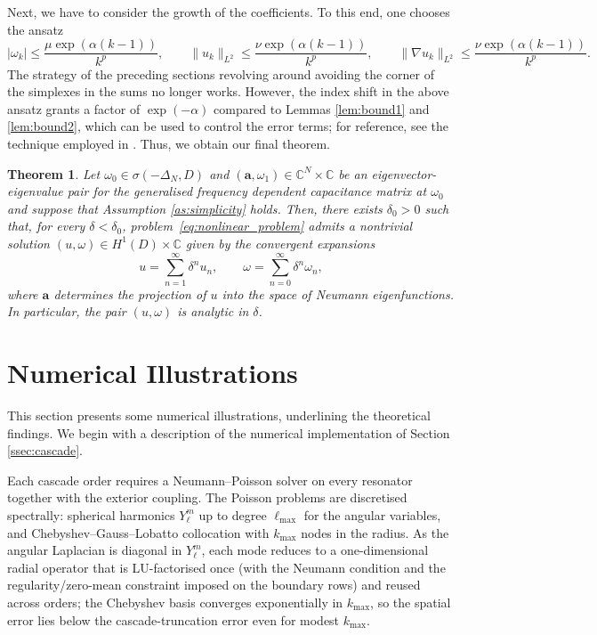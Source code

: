 \documentclass[a4paper,reqno,twoside]{amsart}
\numberwithin{equation}{section}
\newtheorem{theorem}{Theorem}[section]
\theoremstyle{definition}
\newcommand{\<}{\ensuremath \leq}
\renewcommand{\>}{\ensuremath \geq}
\begin{document}
Next, we have to consider the growth of the coefficients. To this end, one chooses the ansatz
\begin{equation}
    \lvert \omega_k \rvert \leq \frac{\mu \exp(\alpha(k-1))}{k^p},
        \qquad
        \lVert u_k \rVert_{L^2} \leq \frac{\nu \exp(\alpha (k-1))}{k^p},
        \qquad
        \lVert \nabla u_k \rVert_{L^2} \leq \frac{\nu \exp(\alpha (k-1))}{k^p}.
\end{equation}
The strategy of the preceding sections revolving around avoiding the corner of the simplexes in the sums no longer works. However, the index shift in the above ansatz grants a factor of $\exp(-\alpha)$ compared to Lemmas \ref{lem:bound1} and \ref{lem:bound2}, which can be used to control the error terms; for reference, see the technique employed in \cite{sacchetti2023perturbation}. Thus, we obtain our final theorem.
\begin{theorem}\label{thm:approximation_convergence_nonlinear}
    Let $\omega_0\in\sigma(-\Delta_N,D)$ and $(\mathbf{a}, \omega_1) \in \mathbb{C}^N \times \mathbb{C}$ be an eigenvector-eigenvalue pair for the generalised frequency dependent capacitance matrix at $\omega_0$ and suppose that Assumption \ref{as:simplicity} holds.
    Then, there exists $\delta_0 > 0$ such that, for every
    $\delta < \delta_0$, problem~\eqref{eq:nonlinear_problem} admits
    a nontrivial solution $(u, \omega) \in H^1(D) \times \mathbb{C}$
    given by the convergent expansions
    \begin{equation}
        u = \sum_{n=1}^{\infty} \delta^{n} u_n,
        \qquad
        \omega = \sum_{n=0}^{\infty} \delta^{n} \omega_n,
    \end{equation}
    where $\mathbf{a}$ determines the projection of $u$ into the space of Neumann eigenfunctions. In particular, the pair $(u,\omega)$ is analytic in $\delta$.
\end{theorem}


\section{Numerical Illustrations}\label{sec:numerics} 
This section presents some numerical illustrations, underlining the theoretical findings. We begin with a description of the numerical implementation of Section \ref{ssec:cascade}.

Each cascade order requires a Neumann--Poisson solver on every resonator
together with the exterior coupling. The Poisson problems are discretised
spectrally: spherical harmonics $Y_\ell^m$ up to degree $\ell_{\max}$ for the
angular variables, and Chebyshev--Gauss--Lobatto collocation with $k_{\max}$
nodes in the radius. As the angular Laplacian is diagonal in $Y_\ell^m$, each
mode reduces to a one-dimensional radial operator that is LU-factorised once
(with the Neumann condition and the regularity/zero-mean constraint imposed on
the boundary rows) and reused across orders; the Chebyshev basis converges
exponentially in $k_{\max}$, so the spatial error lies below the
cascade-truncation error even for modest $k_{\max}$.
\end{document}
